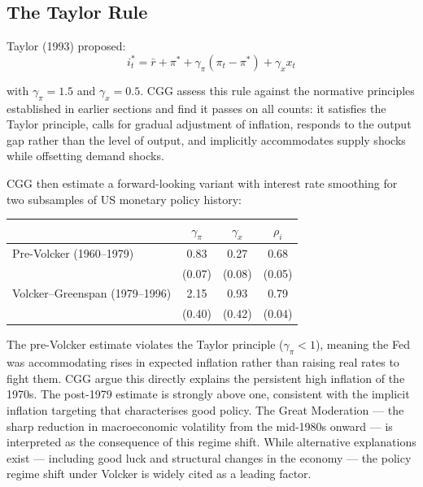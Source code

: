 \documentclass[11pt, a4paper]{article}
\begin{document}
\subsection*{The Taylor Rule}

Taylor (1993) proposed:
\begin{equation}
    i_t^* = \bar{r} + \pi^* + \gamma_\pi(\pi_t - \pi^*) + \gamma_x x_t
\end{equation}

with $\gamma_\pi = 1.5$ and $\gamma_x = 0.5$. CGG assess this rule against
the normative principles established in earlier sections and find it passes
on all counts: it satisfies the Taylor principle, calls for gradual
adjustment of inflation, responds to the output gap rather than the level of
output, and implicitly accommodates supply shocks while offsetting demand
shocks.

CGG then estimate a forward-looking variant with interest rate smoothing for
two subsamples of US monetary policy history:

\begin{center}
\begin{tabular}{lccc}
\toprule
& $\gamma_\pi$ & $\gamma_x$ & $\rho_i$ \\
\midrule
Pre-Volcker (1960--1979)       & 0.83 & 0.27 & 0.68 \\
                               & (0.07) & (0.08) & (0.05) \\[0.3em]
Volcker--Greenspan (1979--1996) & 2.15 & 0.93 & 0.79 \\
                               & (0.40) & (0.42) & (0.04) \\
\bottomrule
\end{tabular}
\end{center}

The pre-Volcker estimate violates the Taylor principle ($\gamma_\pi < 1$),
meaning the Fed was accommodating rises in expected inflation rather than
raising real rates to fight them. CGG argue this directly explains the
persistent high inflation of the 1970s. The post-1979 estimate is strongly
above one, consistent with the implicit inflation targeting that characterises
good policy. The Great Moderation --- the sharp reduction in macroeconomic
volatility from the mid-1980s onward --- is interpreted as the consequence of
this regime shift. While alternative explanations exist --- including good
luck and structural changes in the economy --- the policy regime shift under
Volcker is widely cited as a leading factor.
\end{document}
